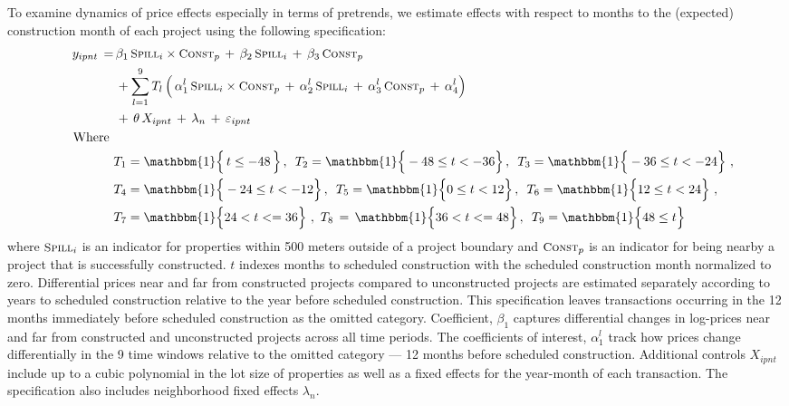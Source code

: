 \documentclass[12pt]{article}
\begin{document}
To examine dynamics of price effects especially in terms of pretrends, we estimate effects with respect to months to the (expected) construction month of each project using the following specification:
\begin{align}
\label{eq:pricerobust}
\begin{split}
\quad y_{ipnt} \, =&   \, \beta_1 \, \textsc{\small Spill}_{i}\times\textsc{\small Const}_{p} \, + \, \beta_2 \, \textsc{\small Spill}_{i} \, + \, \beta_3 \, \textsc{\small Const}_{p}\,  \\
 &\, + \sum_{l=1}^{9} T_{l} \, \Big( \, \alpha_1^{l} \, \textsc{\small Spill}_{i}\times\textsc{\small Const}_{p} \, + \, \alpha_2^{l} \, \textsc{\small Spill}_{i} \, + \, \alpha_3^{l} \, \textsc{\small Const}_{p}\, +\, \alpha_4^{l} \Big) \,  \\
&\, + \, \theta \, X_{ipnt} \, + \, \lambda_n \, + \, \varepsilon_{ipnt} \quad \\
\text{Where }& \\
&T_1 = \mathbbm{1} \Big\{\, t \leq -48  \,\Big\} \,, \,\,\, T_2 = \mathbbm{1} \Big\{ -48 \leq t < -36 \Big\} \,, \,\,\, T_3 = \mathbbm{1} \Big\{ -36 \leq t < -24 \Big\} \,\,, \\
&T_4 = \mathbbm{1}  \Big\{ -24 \leq t < -12 \Big\} \,, \,\,\, T_5 = \mathbbm{1} \Big\{ 0 \leq t < 12 \Big\} \,, \,\,\, T_6 = \mathbbm{1} \Big\{ 12 \leq t < 24 \Big\} \,\,, \\
&T_7 = \mathbbm{1} \Big\{ 24< t<=36 \Big\} \,\, ,\,\,T_8\,=\,\mathbbm{1} \Big\{ 36< t <=48 \Big\} \, , \,\,\, T_9 = \mathbbm{1} \Big\{ 48 \leq t \Big\} 
\end{split}
\end{align}
\noindent where $\textsc{\small Spill}_{i}$ is an indicator for properties within 500 meters outside of a project boundary and $\textsc{\small Const}_{p}$ is an indicator for being nearby a project that is successfully constructed.  $t$ indexes months to scheduled construction with the scheduled construction month normalized to zero.  Differential prices near and far from constructed projects compared to unconstructed projects are estimated separately according to years to scheduled construction relative to the year before scheduled construction.  This specification leaves transactions occurring in the 12 months immediately before scheduled construction as the omitted category.  Coefficient, $\beta_1$ captures differential changes in log-prices near and far from constructed and unconstructed projects across all time periods.  The coefficients of interest, $\alpha_1^{l}$ track how prices change differentially in the 9 time windows relative to the omitted category --- 12 months before scheduled construction.  Additional controls $X_{ipnt}$ include up to a cubic polynomial in the lot size of properties as well as a fixed effects for the year-month of each transaction.  The specification also includes neighborhood fixed effects $\lambda_n$.  
\end{document}
